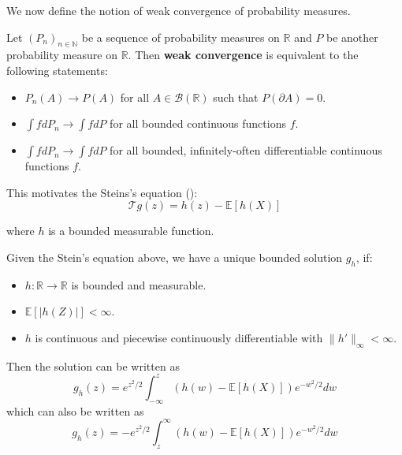 \documentclass{article}
\begin{document}
We now define the notion of weak convergence of probability measures.  

\begin{definition}
   Let $(P_n)_{n\in \mathbb{N}}$ be a sequence of probability measures on $\mathbb{R}$ and $P$ be another probability measure on $\mathbb{R}$. Then \textbf{weak convergence} is equivalent to the following statements:
   \begin{itemize}
    \item $P_n(A) \to P(A)$ for all $A \in \mathcal{B}(\mathbb{R})$ such that $P(\partial A)=0$.
    \item $\int f dP_n \to \int f dP$ for all bounded continuous functions $f$.
    \item $\int f dP_n \to \int f dP$ for all bounded, infinitely-often differentiable continuous functions $f$.
   \end{itemize}
\end{definition}

This motivates the Steins's equation ():
\begin{equation}\label{eq:stein_equation_normal}
    \mathcal{T}g(z) = h(z) - \mathbb{E}[h(X)]
\end{equation}

where $h$ is a bounded measurable function.


\begin{lemma}\label{lem:stein_equation_normal}
    Given the Stein's equation above, we have a unique bounded solution $g_h$, if:
    \begin{itemize}
        \item $h:\mathbb{R} \to \mathbb{R}$ is bounded and measurable.
        \item $\mathbb{E}[|h(Z)|] < \infty$.
        \item $h$ is continuous and piecewise continuously differentiable with $\|h'\|_\infty < \infty$.
    \end{itemize}

        Then the solution can be written as
        \begin{equation*}
            g_h(z) = e^{z^2/2} \int_{-\infty}^z (h(w) - \mathbb{E}[h(X)]) e^{-w^2/2} dw
        \end{equation*}
        which can also be written as
        \begin{equation*}
            g_h(z) = -e^{z^2/2} \int_{z}^\infty (h(w) - \mathbb{E}[h(X)]) e^{-w^2/2} dw
        \end{equation*}
    \end{lemma}
\end{document}
